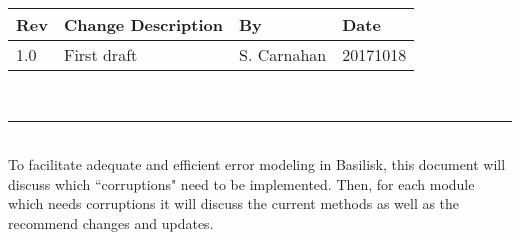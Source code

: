 \documentclass[]{BasiliskReportMemo}
\begin{document}
\makeCover

%
%
\pagestyle{empty}
{\renewcommand{\arraystretch}{2}
	\noindent
	\begin{longtable}{|p{0.5in}|p{3.5in}|p{1.07in}|p{0.9in}|}
		\hline
		{\bfseries Rev} & {\bfseries Change Description} & {\bfseries By}& {\bfseries Date} \\
		\hline
		1.0 & First draft & S. Carnahan & 20171018 \\
		\hline

	\end{longtable}
}

\newpage
\setcounter{page}{1}
\pagestyle{fancy}

\tableofcontents %
~\\ \hrule ~\\ %

To facilitate adequate and efficient error modeling in Basilisk, this document will discuss which ``corruptions" need to be implemented. Then, for each module which needs corruptions it will discuss the current methods as well as the recommend changes and updates.
\end{document}
